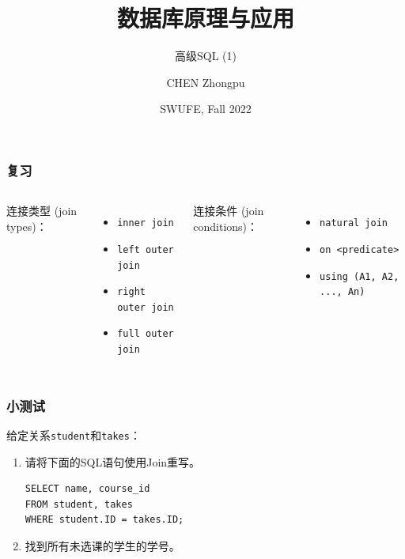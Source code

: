 \documentclass[aspectratio=169, 14pt]{beamer}
\title[Database Principles and Applications] %
{数据库原理与应用}
\subtitle{高级SQL (1)}
\author[CHEN Zhongpu] %
{CHEN Zhongpu}
\institute[] %
{
  School of Computing and Artificial Intelligence \\
  \href{mailto:zpchen@swufe.edu.cn}{zpchen@swufe.edu.cn}
}
\date[] %
{SWUFE, Fall 2022}
\begin{document}
\frame{\titlepage}

\begin{frame}
    \frametitle{复习}
    \begin{columns}
        连接类型 (join types)：
        \begin{itemize}
            \item \texttt{inner join}
            \item \texttt{left outer join}
            \item \texttt{right outer join}
            \item \texttt{full outer join}
        \end{itemize}
        连接条件 (join conditions)：
        \begin{itemize}
            \item \texttt{natural join}
            \item \texttt{on <predicate>}
            \item \texttt{using (A1, A2, ..., An)}
        \end{itemize}
    \end{columns}
\end{frame}

\begin{frame}[fragile]
    \frametitle{小测试}
给定关系\texttt{student}和\texttt{takes}：
\begin{enumerate}
    \item 请将下面的SQL语句使用Join重写。
    \begin{verbatim}
SELECT name, course_id
FROM student, takes
WHERE student.ID = takes.ID;
    \end{verbatim}
    \item 找到所有未选课的学生的学号。
\end{enumerate}


\end{frame}
\end{document}
